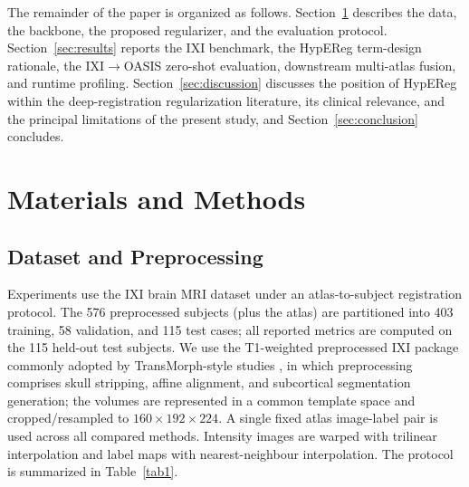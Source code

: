 \documentclass[jimaging,article,submit,pdftex,moreauthors]{Definitions/mdpi}
\begin{document}
The remainder of the paper is organized as follows. Section~\ref{sec:methods} describes the data, the backbone, the proposed regularizer, and the evaluation protocol. Section~\ref{sec:results} reports the IXI benchmark, the HypEReg term-design rationale, the IXI\(\to\)OASIS zero-shot evaluation, downstream multi-atlas fusion, and runtime profiling. Section~\ref{sec:discussion} discusses the position of HypEReg within the deep-registration regularization literature, its clinical relevance, and the principal limitations of the present study, and Section~\ref{sec:conclusion} concludes.

\section{Materials and Methods}\label{sec:methods}

\subsection{Dataset and Preprocessing}
Experiments use the IXI brain MRI dataset \cite{ixidataset} under an atlas-to-subject registration protocol. The 576 preprocessed subjects (plus the atlas) are partitioned into 403 training, 58 validation, and 115 test cases; all reported metrics are computed on the 115 held-out test subjects. We use the T1-weighted preprocessed IXI package commonly adopted by TransMorph-style studies \cite{chen2022transmorph,kim2021cyclemorph}, in which preprocessing comprises skull stripping, affine alignment, and subcortical segmentation generation; the volumes are represented in a common template space and cropped/resampled to \(160 \times 192 \times 224\). A single fixed atlas image-label pair is used across all compared methods. Intensity images are warped with trilinear interpolation and label maps with nearest-neighbour interpolation. The protocol is summarized in Table~\ref{tab1}.
\end{document}
